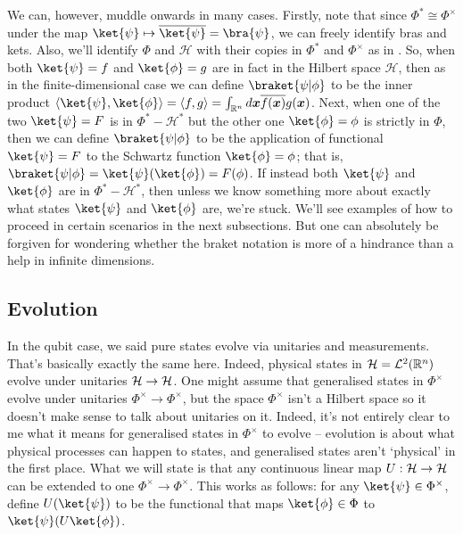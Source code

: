 We can, however, muddle onwards in many cases.
Firstly, note that since $\Phi^* \cong \Phi^\times$ under the map $\ket{\psi} \mapsto \overline{\ket{\psi}} = \bra{\psi}$, we can freely identify bras and kets.
Also, we'll identify $\Phi$ and $\mathcal{H}$ with their copies in $\Phi^*$ and $\Phi^\times$ as in .
So, when both $\ket{\psi} = f$ and $\ket{\phi} = g$ are in fact in the Hilbert space $\mathcal{H}$, then as in the finite-dimensional case we can define $\braket{\psi|\phi}$ to be the inner product $\langle \ket{\psi}, \ket{\phi} \rangle = \langle f, g \rangle = \int_{\mathbb{R}^n} d\boldsymbol{x} \overline{f(\boldsymbol{x})} g(\boldsymbol{x})$.
Next, when one of the two $\ket{\psi} = F$ is in $\Phi^* - \mathcal{H}^*$ but the other one $\ket{\phi} = \phi$ is strictly in $\Phi$, then we can define $\braket{\psi|\phi}$ to be the application of functional $\ket{\psi} = F$ to the Schwartz function $\ket{\phi} = \phi$; that is, $\braket{\psi|\phi} = \ket{\psi}(\ket{\phi}) = F(\phi)$.
If instead both $\ket{\psi}$ and $\ket{\phi}$ are in $\Phi^* - \mathcal{H}^*$, then unless we know something more about exactly what states $\ket{\psi}$ and $\ket{\phi}$ are, we're stuck.
We'll see examples of how to proceed in certain scenarios in the next subsections.
But one can absolutely be forgiven for wondering whether the braket notation is more of a hindrance than a help in infinite dimensions.

\subsection{Evolution}\label{subsec:qumode_evolution}

In the qubit case, we said pure states evolve via unitaries and measurements.
That's basically exactly the same here.
Indeed, physical states in $\mathcal{H} = \mathcal{L}^2(\mathbb{R}^n)$ evolve under unitaries $\mathcal{H} \to \mathcal{H}$.
One might assume that generalised states in $\Phi^\times$ evolve under unitaries $\Phi^\times \to \Phi^\times$, but the space $\Phi^\times$ isn't a Hilbert space so it doesn't make sense to talk about unitaries on it.
Indeed, it's not entirely clear to me what it means for generalised states in $\Phi^\times$ to evolve -- evolution is about what physical processes can happen to states, and generalised states aren't `physical' in the first place.
What we will state is that any continuous linear map $U: \mathcal{H} \to \mathcal{H}$ can be extended to one $\Phi^\times \to \Phi^\times$.
This works as follows: for any $\ket{\psi} \in \Phi^\times$, define $U(\ket{\psi})$ to be the functional that maps $\ket{\phi} \in \Phi$ to $\ket{\psi}(U\ket{\phi})$.

